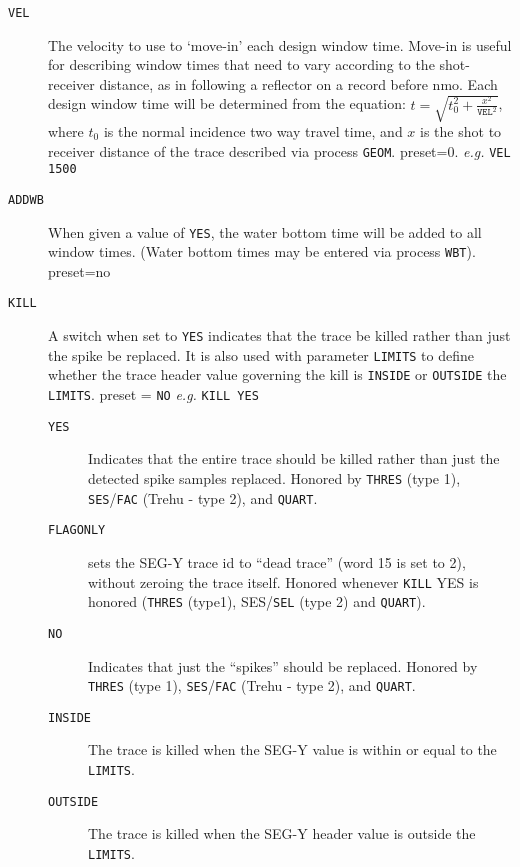 \begin{description}
\item[\texttt{VEL}] The velocity to use to `move-in' each design window time.
         Move-in is useful for describing window times that need
         to vary according to the shot-receiver distance, as in
         following a reflector on a record before nmo.  Each
         design window time will be determined from the equation:
         $t = \sqrt{t_{0}^{2}+\frac{x^{2}}{\texttt{VEL}^{2}}}$, where $t_{0}$ is the normal
         incidence two way travel time, and $x$ is the \gls{shot} to
         receiver distance of the trace described via process \texttt{GEOM}.
         \Gls{preset}=0.        \textit{e.g.}   \texttt{VEL 1500}

\item[\texttt{ADDWB}] When given a value of \texttt{YES}, the water bottom time will be
         added to all window times.  (Water bottom times may be
         entered via process \texttt{WBT}).
         \Gls{preset}=no

\item[\texttt{KILL}] A switch when set to \texttt{YES} indicates that the trace be
         killed rather than just the spike be replaced.  It is also
         used with parameter \texttt{LIMITS} to define whether the trace
         header value governing the kill is \texttt{INSIDE} or \texttt{OUTSIDE} the
         \texttt{LIMITS}.  \Gls{preset} = \texttt{NO} \textit{e.g.}   \texttt{KILL YES}
\begin{description}
\item[\texttt{YES}] Indicates that the entire trace should be killed rather
         than just the detected spike samples replaced.  Honored
         by \texttt{THRES} (type 1), \texttt{SES}/\texttt{FAC} (Trehu - type 2), and \texttt{QUART}.
\item[\texttt{FLAGONLY}] sets the SEG-Y trace id to ``dead trace'' (word
         15 is set to 2), without zeroing the trace itself.  Honored
         whenever \texttt{KILL} YES is honored (\texttt{THRES} (type1), SES/\texttt{SEL}
         (type 2) and \texttt{QUART}).
\item[\texttt{NO}] Indicates that just the ``spikes'' should be replaced.
         Honored by \texttt{THRES} (type 1), \texttt{SES}/\texttt{FAC} (Trehu - type 2), and
         \texttt{QUART}.
\item[\texttt{INSIDE}] The trace is killed when the SEG-Y value is within
         or equal to the \texttt{LIMITS}.
\item[\texttt{OUTSIDE}] The trace is killed when the SEG-Y header value
         is outside the \texttt{LIMITS}.
\end{description}


\end{description}
